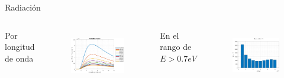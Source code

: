\documentclass[spanish,a4paper]{beamer}%
\newcommand{\resRadPath}{\graphicspath{{./figuras/Resultados/radiacion/}}}
\begin{document}
		\begin{frame}{Radiación}
			\resRadPath
			\begin{columns}
						\begin{block}{\centering Por longitud de onda}
						\end{block}
					\vspace{15pt}
						\begin{figure}[h]%
								\centering
										\includegraphics[width=\columnwidth]{SsGe}
								\label{fig:SsSiO2Ge_rad}%
						\end{figure}
						\vfill
					\vspace{-10pt}
						\begin{block}{\centering En el rango de $E>0.7eV$}
							\end{block}
					\vspace{10pt}
						\begin{figure}[h]%
								\centering
										\includegraphics[width=\columnwidth]{p_Eg_SsGe}%
								\label{fig:SsSiO2Ge_radInt}%
						\end{figure}
						\vfill
				\end{columns}		
		\end{frame}
\end{document}
